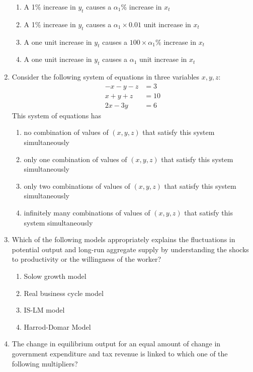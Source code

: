 \documentclass[journal,12pt,onecolumn]{exam}
\theoremstyle{remark}
\begin{document}
\begin{enumerate}
  \begin{enumerate}
    \item A 1\% increase in $y_t$ causes a $\alpha_1$\% increase in $x_t$
    \item A 1\% increase in $y_t$ causes a $\alpha_1 \times 0.01$ unit increase in $x_t$
    \item A one unit increase in $y_t$ causes a $100 \times \alpha_1$\% increase in $x_t$
    \item A one unit increase in $y_t$ causes a $\alpha_1$ unit increase in $x_t$
  \end{enumerate}
  \newpage
   \item Consider the following system of equations in three variables $x, y, z$:
  \[
  \begin{aligned}
    -x - y - z &= 3 \\
    x + y + z &= 10 \\
    2x - 3y &= 6
  \end{aligned}
  \]
  This system of equations has

  \begin{enumerate}
    \item no combination of values of $(x, y, z)$ that satisfy this system simultaneously
    \item only one combination of values of $(x, y, z)$ that satisfy this system simultaneously
    \item only two combinations of values of $(x, y, z)$ that satisfy this system simultaneously
    \item infinitely many combinations of values of $(x, y, z)$ that satisfy this system simultaneously
  \end{enumerate}
  \item Which of the following models appropriately explains the fluctuations in potential output and long-run aggregate supply by understanding the shocks to productivity or the willingness of the worker?

  \begin{enumerate}[label=(\Alph*)]
    \item Solow growth model
    \item Real business cycle model
    \item IS-LM model
    \item Harrod-Domar Model
  \end{enumerate}

  \item The change in equilibrium output for an equal amount of change in government expenditure and tax revenue is linked to which one of the following multipliers?


\end{enumerate}
\end{document}
